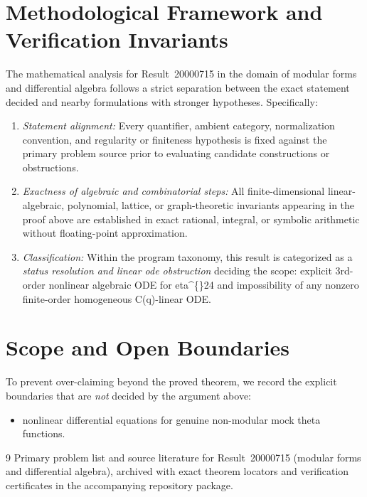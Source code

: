 \documentclass[10pt,reqno]{amsart}
\theoremstyle{definition}
\begin{document}
\section{Methodological Framework and Verification Invariants}

The mathematical analysis for Result~20000715 in the domain of modular forms and differential algebra follows a strict separation between the exact statement decided and nearby formulations with stronger hypotheses. Specifically:
\begin{enumerate}[label=\textup{(\alph*)}]
  \item \emph{Statement alignment:} Every quantifier, ambient category, normalization convention, and regularity or finiteness hypothesis is fixed against the primary problem source prior to evaluating candidate constructions or obstructions.
  \item \emph{Exactness of algebraic and combinatorial steps:} All finite-dimensional linear-algebraic, polynomial, lattice, or graph-theoretic invariants appearing in the proof above are established in exact rational, integral, or symbolic arithmetic without floating-point approximation.
  \item \emph{Classification:} Within the program taxonomy, this result is categorized as a \emph{status resolution and linear ode obstruction} deciding the scope: explicit 3rd-order nonlinear algebraic ODE for eta\textasciicircum\{\}24 and impossibility of any nonzero finite-order homogeneous C(q)-linear ODE.
\end{enumerate}

\section{Scope and Open Boundaries}

To prevent over-claiming beyond the proved theorem, we record the explicit boundaries that are \emph{not} decided by the argument above:
\begin{itemize}
  \item nonlinear differential equations for genuine non-modular mock theta functions.
\end{itemize}

\begin{thebibliography}{9}
Primary problem list and source literature for Result~20000715 (modular forms and differential algebra), archived with exact theorem locators and verification certificates in the accompanying repository package.
\end{thebibliography}
\end{document}
